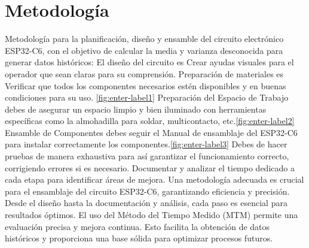     \section{Metodología}
    Metodología para la planificación, diseño y ensamble del circuito electrónico ESP32-C6, con el objetivo de calcular la media y varianza desconocida para generar datos históricos:
    El diseño del circuito es Crear ayudas visuales para el operador que sean claras para su comprensión.
    Preparación de materiales es Verificar que todos los componentes necesarios estén disponibles y en buenas condiciones para su uso.
    \ref{fig:enter-label1}
    Preparación del Espacio de Trabajo debes de asegurar un espacio limpio y bien iluminado con herramientas específicas como la almohadilla para soldar, multicontacto, etc.\ref{fig:enter-label2} 
    Ensamble de Componentes debes seguir el Manual de ensamblaje del ESP32-C6 para instalar correctamente los componentes.\ref{fig:enter-label3}
    Debes de hacer pruebas de manera exhaustiva para así garantizar el funcionamiento correcto, corrigiendo errores si es necesario. Documentar y analizar el tiempo dedicado a cada etapa para identificar áreas de mejora.
    Una metodología adecuada es crucial para el ensamblaje del circuito ESP32-C6, garantizando eficiencia y precisión. Desde el diseño hasta la documentación y análisis, cada paso es esencial para resultados óptimos. El uso del Método del Tiempo Medido (MTM) permite una evaluación precisa y mejora continua. Esto facilita la obtención de datos históricos y proporciona una base sólida para optimizar procesos futuros.
